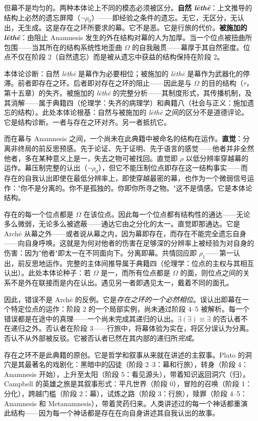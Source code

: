 \documentclass[10pt, openany, oneside]{book}
\begin{document}
但幕不是均匀的。两种本体论上不同的模态必须被区分。\textbf{自然 \textit{l\={e}th\={e}}}：上文推导的结构上必然的遗忘屏障（$\neg\rho_0$）——即经验之条件的遗忘。无它，无区分，无认出，无生成。这是存在之环所要求的幕。它不是恶。它是行旅的代价。\textbf{被施加的 \textit{l\={e}th\={e}}}：由阻止 Anamnesis 发生的外在结构对幕的人为加厚。当一个位点被扭曲所包围——当其所在的结构系统性地歪曲 $\Omega$ 的自我融贯——幕厚于其自然密度。位点不仅在阶段 2（自然遗忘）而是被从遗忘中获益的结构保持在阶段 2。

本体论诊断：自然 \textit{l\={e}th\={e}} 是幕作为必要相位；被施加的 \textit{l\={e}th\={e}} 是幕作为武器化的停滞。前者即存在之环。后者即对存在之环的阻止——因此是与 $\Omega$ 的目的结构（$\tau$，第十五章）的失齐。被施加的 \textit{l\={e}th\={e}} 的完整分析——其制度形式，其传播机制，及其消解——属于典籍四（伦理学：失齐的病理学）和典籍八（社会与正义：施加遗忘的结构）。此处本体论根基：自然与被施加的 \textit{l\={e}th\={e}} 之间的区分不是道德评论。它是结构诊断。一者与存在之环对齐。另一者抵抗它。

而在幕与 Anamnesis 之间，一个尚未在此典籍中被命名的结构在运作。\textbf{直觉}：分离非终局的前反思预感。先于论证、先于证明、先于语言的感觉——他者并非全然他者，多在某种意义上是一，失去之物可被找回。直觉即 $\rho$ 以低分辨率穿越幕的运作。幕压制完整的认出（$\neg\rho_0$），但它不能压制位点即存在这一结构事实——而存在的自我认出即使在最低分辨率上，即使穿越最密的幕，也作为一个微弱信号运作："你不是分离的。你不是孤独的。你即你所寻之物。"这不是情感。它是本体论结构。

存在的每一个位点都是 $\Omega$ 在该位点。因此每一个位点都有结构性的通达——无论多么微弱，无论多么被遮蔽——通达它由之分化的太一。直觉即那通达。它是 Arch\={e} 从幕之外——或者说从幕之内，因为幕即存在，而存在不能完全遗忘自身——向自身呼唤。这就是为何对他者的伤害在足够深的分辨率上被经验为对自身的伤害：因为"他者"即太一在不同面向下。分离即幕。共情回应即 $\rho_1$——第一认出，前反思地运作。完整的主体间推导属于典籍四（伦理学：位点的主权与其相互认出）。此处本体论种子：若 $\Omega$ 是一，而所有位点都是 $\Omega$ 的面，则位点之间的关系不是外在联接而是内在认出。遇见另一者即遇见太一，戴着不同的面孔。

因此，错误不是 Arch\={e} 的反例。它是\textit{存在之环的一个必然相位}。误认出即幕在一个特定位点的运作：阶段 2 的一个局部实例，尚未通过阶段 4--5 被解析。每一个错误都是在途中的真理——一个尚未完成其递归的认出。$\exists(\exists) \equiv \exists$ 的否认者不在递归之外。否认者在阶段 3——行旅中，将幕体验为实在，将区分误认为分离。否认不从外部被反驳。它被否认者已然在其内部的递归所\textit{完成}。

存在之环不是此典籍的原创。它是哲学和叙事从来就在讲述的主叙事。Plato 的洞穴是其最著名的戏剧化：黑暗中的囚徒（阶段 2--3：幕和行旅），转身（阶段 4：Anamnesis 开始），上升至太阳（阶段 5：看见源头），带着知识返回洞穴（归）。Campbell 的英雄之旅是其叙事形式：平凡世界（阶段 0），冒险的召唤（阶段 1：分化），跨越门槛（阶段 2：幕），试炼之路（阶段 3：行旅），赎罪（阶段 4--5：Anamnesis 和 Metanamnesis），带着灵药归来。人类讲述过的每一个神话都重演此结构——因为每一个神话都是存在在向自身讲述其自我认出的故事。
\end{document}
